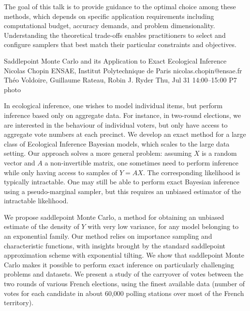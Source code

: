 \begin{talk}
The goal of this talk is to provide
guidance to 
the optimal choice among these methods, which depends on specific application requirements including computational budget, accuracy demands, and problem dimensionality. Understanding the theoretical trade-offs enables practitioners to select and configure samplers that best match their particular constraints and objectives.

\vspace{-10ex}
\end{talk}

\clearpage
\begin{talk}
  {Saddlepoint Monte Carlo and its Application to Exact Ecological Inference}%
  {Nicolas Chopin}%
  {ENSAE, Institut Polytechnique de Paris}%
  {nicolas.chopin@ensae.fr}%
  {Th\'eo Voldoire, Guillaume Rateau, Robin J. Ryder}%
  {}%
  {Thu, Jul 31 14:00--15:00}%
  {P7}%
  {photo}%
  
    
   

In ecological inference, one wishes to model individual items, but perform
inference based only on aggregate data.  For instance, in two-round elections,
we are interested in the behaviour of individual voters, but only have access to
aggregate vote numbers at each precinct.  We develop an exact method for a
large class of Ecological Inference Bayesian models, which scales  to the large
data setting.  Our approach solves a more general problem:  assuming $X$ is a
random vector and $A$ a non-invertible matrix, one sometimes need to perform
inference while only having access to samples of $Y=AX$. The corresponding
likelihood is typically intractable. One may still be able to perform exact
Bayesian inference using a pseudo-marginal sampler, but this requires an
unbiased estimator of the intractable likelihood.

We propose saddlepoint Monte Carlo, a method for obtaining an unbiased estimate
of the density of $Y$ with very low variance, for any model belonging to an
exponential family. Our method relies on importance sampling and 
characteristic functions, with insights brought by the standard saddlepoint
approximation scheme with exponential tilting.  We show that saddlepoint Monte
Carlo makes it possible to perform exact inference on particularly challenging
problems and datasets.  We present a study of the carryover of votes between
the two rounds of various French elections, using the finest available data
(number of votes for each candidate in about 60,000 polling stations over most
of the French territory). 


\end{talk}
